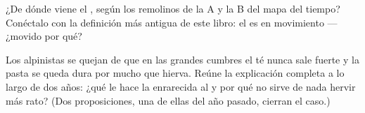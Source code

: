 \begin{exercise}[$\star\star$]\label{exo:g5:air-pressure-weather:10}
¿De dónde viene el , según los remolinos de la A y la B del
mapa del tiempo? Conéctalo con la definición más antigua de este
libro: el  es  en movimiento --- ¿movido por qué?
\end{exercise}

\begin{exercise}[$\star\star$]\label{exo:g5:air-pressure-weather:11}
Los alpinistas se quejan de que en las grandes cumbres el té nunca
sale fuerte y la pasta se queda dura por mucho que hierva. Reúne la
explicación completa a lo largo de dos años: ¿qué le hace la
 enrarecida al  y por qué no sirve
de nada hervir más rato? (Dos proposiciones, una de ellas del año
pasado, cierran el caso.)
\end{exercise}
